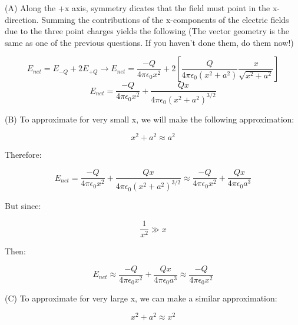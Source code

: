 \begin{solution}

(A) Along the +x axis, symmetry dicates that the field must point in the x-direction. Summing the contributions of the x-components of the electric fields due to the three point charges yields the following (The vector geometry is the same as one of the previous questions. If you haven't done them, do them now!)

\begin{equation*}
    E_{net} = E_{-Q} + 2E_{+Q} \rightarrow
    E_{net} = \frac{-Q}{4\pi\epsilon_0x^2}
              +2[\frac{Q}{4\pi\epsilon_0(x^2+a^2)}
                 \frac{x}{\sqrt{x^2+a^2}}]
\end{equation*}
\begin{equation*}
    E_{net} = \frac{-Q}{4\pi\epsilon_0x^2} +
              \frac{Qx}{4\pi\epsilon_0(x^2+a^2)^{3/2}}
\end{equation*}

(B) To approximate for very small x, we will make the following approximation:

\begin{equation*}
    x^2+a^2\approx a^2
\end{equation*}

Therefore:

\begin{equation*}
    E_{net} = \frac{-Q}{4\pi\epsilon_0x^2} +
              \frac{Qx}{4\pi\epsilon_0(x^2+a^2)^{3/2}}
            \approx
            \frac{-Q}{4\pi\epsilon_0x^2} +
              \frac{Qx}{4\pi\epsilon_0 a^3}
\end{equation*}

But since:

\begin{equation*}
    \frac{1}{x^2} \gg x
\end{equation*}

Then:

\begin{equation*}
    E_{net} \approx 
                \frac{-Q}{4\pi\epsilon_0x^2} +
                \frac{Qx}{4\pi\epsilon_0 a^3}
            \approx
                \frac{-Q}{4\pi\epsilon_0x^2}
\end{equation*}

(C) To approximate for very large x, we can make a similar approximation:

\begin{equation*}
    x^2+a^2 \approx x^2
\end{equation*}


\end{solution}
